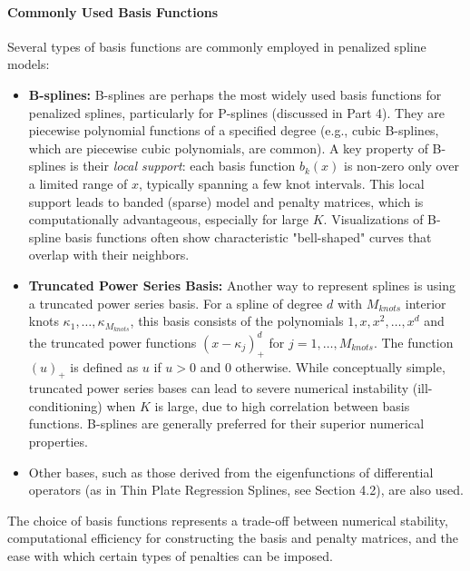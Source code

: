 \documentclass[11pt, a4paper]{article}
\begin{document}
\begin{itemize}
\paragraph{Commonly Used Basis Functions}
Several types of basis functions are commonly employed in penalized spline models:
\begin{itemize}
 \item \textbf{B-splines:} B-splines are perhaps the most widely used basis functions for penalized splines, particularly for P-splines (discussed in Part 4). They are piecewise polynomial functions of a specified degree (e.g., cubic B-splines, which are piecewise cubic polynomials, are common). A key property of B-splines is their \textit{local support}: each basis function $b_k(x)$ is non-zero only over a limited range of $x$, typically spanning a few knot intervals. This local support leads to banded (sparse) model and penalty matrices, which is computationally advantageous, especially for large $K$. Visualizations of B-spline basis functions often show characteristic "bell-shaped" curves that overlap with their neighbors.

 \item \textbf{Truncated Power Series Basis:} Another way to represent splines is using a truncated power series basis. For a spline of degree $d$ with $M_{knots}$ interior knots $\kappa_1, \dots, \kappa_{M_{knots}}$, this basis consists of the polynomials $1, x, x^2, \dots, x^d$ and the truncated power functions $(x-\kappa_j)_+^d$ for $j=1, \dots, M_{knots}$. The function $(u)_+$ is defined as $u$ if $u > 0$ and $0$ otherwise. While conceptually simple, truncated power series bases can lead to severe numerical instability (ill-conditioning) when $K$ is large, due to high correlation between basis functions. B-splines are generally preferred for their superior numerical properties.

 \item Other bases, such as those derived from the eigenfunctions of differential operators (as in Thin Plate Regression Splines, see Section 4.2), are also used.
\end{itemize}
The choice of basis functions represents a trade-off between numerical stability, computational efficiency for constructing the basis and penalty matrices, and the ease with which certain types of penalties can be imposed.


\end{itemize}
\end{document}
